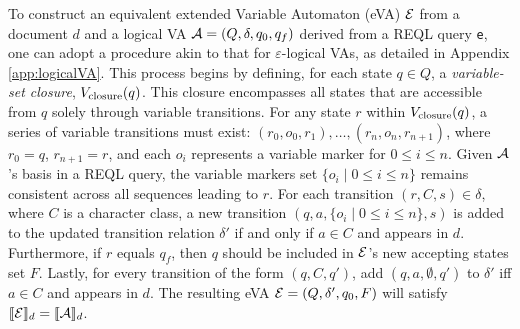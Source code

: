 To construct an equivalent extended Variable Automaton (eVA) $\mathcal{E}$ from a document $d$ and a logical VA $\mathcal{A} = (Q, \delta, q_0, q_f)$ derived from a REQL query \texttt{e}, one can adopt a procedure akin to that for $\varepsilon$-logical VAs, as detailed in Appendix \ref{app:logicalVA}. This process begins by defining, for each state $q \in Q$, a \emph{variable-set closure}, $V_{\text{closure}}(q)$. This closure encompasses all states that are accessible from $q$ solely through variable transitions. For any state $r$ within $V_{\text{closure}}(q)$, a series of variable transitions must exist: $(r_0, o_0, r_1), \ldots, (r_n, o_n, r_{n+1})$, where $r_0 = q$, $r_{n+1} = r$, and each $o_i$ represents a variable marker for $0 \leq i \leq n$. Given $\mathcal{A}$'s basis in a REQL query, the variable markers set $\{o_i \mid 0 \leq i \leq n\}$ remains consistent across all sequences leading to $r$. For each transition $(r, C, s) \in \delta$, where $C$ is a character class, a new transition $(q, a, \{o_i \mid 0 \leq i \leq n\}, s)$ is added to the updated transition relation $\delta'$ if and only if $a \in C$ and appears in $d$. Furthermore, if $r$ equals $q_f$, then $q$ should be included in $\mathcal{E}$'s new accepting states set $F$. Lastly, for every transition of the form $(q, C, q')$, add $(q, a, \emptyset, q')$ to $\delta'$ iff $a \in C$ and appears in $d$. The resulting eVA $\mathcal{E} = (Q, \delta', q_0, F)$ will satisfy $\llbracket\mathcal{E}\rrbracket_d = \llbracket\mathcal{A}\rrbracket_d$.